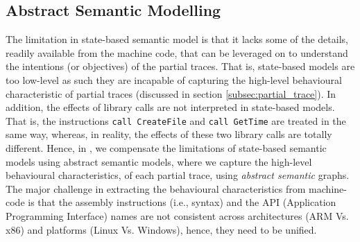 \subsection{Abstract Semantic Modelling} \label{subsec:abs_sem_mod}

The limitation in state-based semantic model is that it lacks some of the details, readily available from the machine code, that can be leveraged on to understand the intentions (or objectives) of the partial traces. That is, state-based models are too low-level as such they are incapable of capturing the high-level behavioural characteristic of partial traces (discussed in section \ref{subsec:partial_trace}). In addition, the effects of library calls are not interpreted in state-based models. That is, the instructions \texttt{call CreateFile} and \texttt{call GetTime} are treated in the same way, whereas, in reality, the effects of these two library calls are totally different. Hence, in \tool, we compensate the limitations of state-based semantic models using abstract semantic models, where we capture the high-level behavioural characteristics, of each partial trace, using \textit{abstract semantic} graphs. The major challenge in extracting the behavioural characteristics from machine-code is that the assembly instructions (i.e., syntax) and the API (Application Programming Interface) names are not consistent across architectures (ARM Vs. x86) and platforms (Linux Vs. Windows), hence, they need to be unified.

